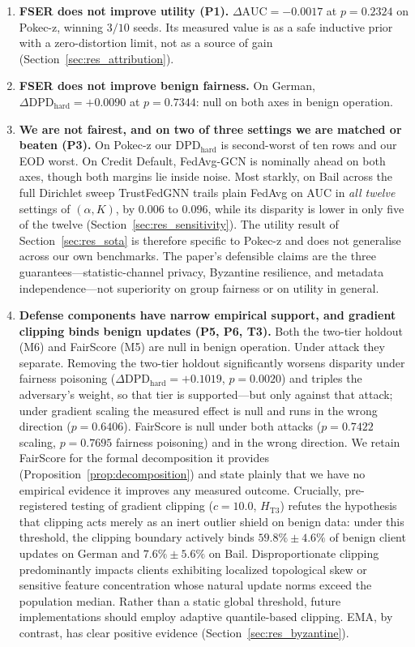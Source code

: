 \documentclass[preprint,12pt]{elsarticle}
\theoremstyle{plain}
\theoremstyle{definition}
\theoremstyle{remark}
\newcommand{\dpd}{\mathrm{DPD}}
\begin{document}
\begin{enumerate}
\item \textbf{FSER does not improve utility (P1).} $\Delta\mathrm{AUC} = -0.0017$ at $p = 0.2324$ on Pokec-z, winning $3/10$ seeds. Its measured value is as a safe inductive prior with a zero-distortion limit, not as a source of gain (Section~\ref{sec:res_attribution}).

\item \textbf{FSER does not improve benign fairness.} On German, $\Delta\dpd_{\mathrm{hard}} = +0.0090$ at $p = 0.7344$: null on both axes in benign operation.

\item \textbf{We are not fairest, and on two of three settings we are matched or beaten (P3).} On Pokec-z our $\dpd_{\mathrm{hard}}$ is second-worst of ten rows and our EOD worst. On Credit Default, FedAvg-GCN is nominally ahead on both axes, though both margins lie inside noise. Most starkly, on Bail across the full Dirichlet sweep TrustFedGNN trails plain FedAvg on AUC in \emph{all twelve} settings of $(\alpha, K)$, by $0.006$ to $0.096$, while its disparity is lower in only five of the twelve (Section~\ref{sec:res_sensitivity}). The utility result of Section~\ref{sec:res_sota} is therefore specific to Pokec-z and does not generalise across our own benchmarks. The paper's defensible claims are the three guarantees---statistic-channel privacy, Byzantine resilience, and metadata independence---not superiority on group fairness or on utility in general.

\item \textbf{Defense components have narrow empirical support, and gradient clipping binds benign updates (P5, P6, T3).} Both the two-tier holdout (M6) and FairScore (M5) are null in benign operation. Under attack they separate. Removing the two-tier holdout significantly worsens disparity under fairness poisoning ($\Delta\dpd_{\mathrm{hard}} = +0.1019$, $p = 0.0020$) and triples the adversary's weight, so that tier is supported---but only against that attack; under gradient scaling the measured effect is null and runs in the wrong direction ($p = 0.6406$). FairScore is null under both attacks ($p = 0.7422$ scaling, $p = 0.7695$ fairness poisoning) and in the wrong direction. We retain FairScore for the formal decomposition it provides (Proposition~\ref{prop:decomposition}) and state plainly that we have no empirical evidence it improves any measured outcome. Crucially, pre-registered testing of gradient clipping ($c = 10.0$, $H_{\text{T3}}$) refutes the hypothesis that clipping acts merely as an inert outlier shield on benign data: under this threshold, the clipping boundary actively binds $59.8\% \pm 4.6\%$ of benign client updates on German and $7.6\% \pm 5.6\%$ on Bail. Disproportionate clipping predominantly impacts clients exhibiting localized topological skew or sensitive feature concentration whose natural update norms exceed the population median. Rather than a static global threshold, future implementations should employ adaptive quantile-based clipping. EMA, by contrast, has clear positive evidence (Section~\ref{sec:res_byzantine}).


\end{enumerate}
\end{document}
